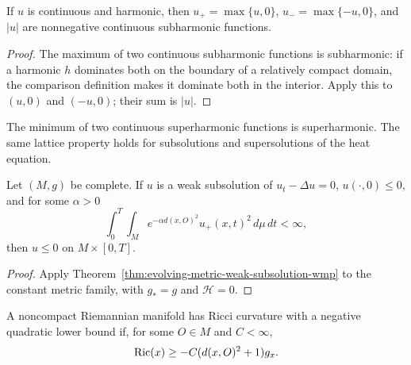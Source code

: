 \begin{lemma}
\label{lem:absolute-value-harmonic-subsolution}
If $u$ is continuous and harmonic, then $u_+=\max\{u,0\}$,
$u_-=\max\{-u,0\}$, and $|u|$ are nonnegative continuous subharmonic
functions.
\end{lemma}

\begin{proof}
The maximum of two continuous subharmonic functions is subharmonic: if a
harmonic $h$ dominates both on the boundary of a relatively compact domain,
the comparison definition makes it dominate both in the interior.  Apply this
to $(u,0)$ and $(-u,0)$; their sum is $|u|$.
\end{proof}

\begin{remark}
\label{rem:minimum-superharmonic-functions}
The minimum of two continuous superharmonic functions is superharmonic.  The
same lattice property holds for subsolutions and supersolutions of the heat
equation.
\end{remark}

\begin{theorem}
\label{thm:static-weak-subsolution-wmp}
Let $(M,g)$ be complete.  If $u$ is a weak subsolution of $u_t-\Delta u=0$,
$u(\cdot,0)\leq0$, and for some $\alpha>0$
\[
\int_0^T\!\int_M e^{-\alpha d(x,O)^2}u_+(x,t)^2\,d\mu\,dt<\infty,
\]
then $u\leq0$ on $M\times[0,T]$.
\end{theorem}

\begin{proof}
Apply Theorem~\ref{thm:evolving-metric-weak-subsolution-wmp} to the constant
metric family, with $g_*=g$ and $\mathcal H=0$.
\end{proof}

\begin{definition}
\label{def:negative-quadratic-ricci-lower-bound}
A noncompact Riemannian manifold has Ricci curvature with a negative
quadratic lower bound if, for some $O\in M$ and $C<\infty$,
\[
\operatorname{Ric}(x)\geq-C(d(x,O)^2+1)g_x.
\]
\end{definition}

